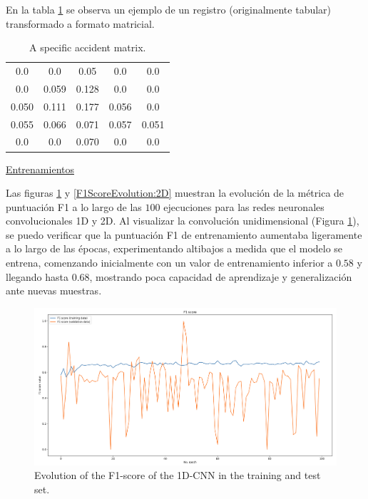\documentclass{uathesis-es}
\begin{document}
En la tabla \ref{1stPaperFeaturesNormalizationExample} se observa un ejemplo de un registro (originalmente tabular) transformado a formato matricial.

\begin{table}[H]
	\centering
	\begin{tabular}{|ccccc|}
		0.0   & 0.0   & 0.05  & 0.0   & 0.0 \\
		0.0   & 0.059 & 0.128 & 0.0   & 0.0 \\ 
		0.050 & 0.111 & 0.177 & 0.056 & 0.0 \\
		0.055 & 0.066 & 0.071 & 0.057 & 0.051 \\
		0.0   & 0.0   & 0.070 & 0.0   & 0.0 \\
	\end{tabular}
	\caption{A specific accident matrix.}
	\label{1stPaperFeaturesNormalizationExample}
\end{table}



\underline{Entrenamientos}


Las figuras \ref{F1ScoreEvolution:1D} y \ref{F1ScoreEvolution:2D} muestran la evolución de la métrica de puntuación F1 a lo largo de las $100$ ejecuciones para las redes neuronales convolucionales 1D y 2D. Al visualizar la convolución unidimensional (Figura \ref{F1ScoreEvolution:1D}), se puedo verificar que la puntuación F1 de entrenamiento aumentaba ligeramente a lo largo de las épocas, experimentando altibajos a medida que el modelo se entrena, comenzando inicialmente con un valor de entrenamiento inferior a $0.58$ y llegando hasta $0.68$, mostrando poca capacidad de aprendizaje y generalización ante nuevas muestras.

 \begin{figure}[H]
	\centering
	\includegraphics[width=14cm]{Figures/1stPaper/F1Score1D}
	\caption{Evolution of the F1-score of the 1D-CNN in the training and test set.}
	\label{F1ScoreEvolution:1D}
\end{figure}
\end{document}
